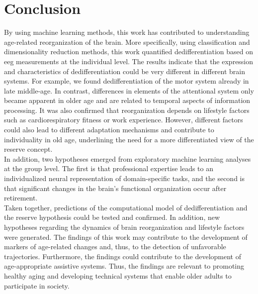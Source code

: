 \section{Conclusion}
By using machine learning methods, this work has contributed to understanding age-related reorganization of the brain. More specifically, using classification and dimensionality reduction methods, this work quantified dedifferentiation based on \gls{eeg} measurements at the individual level. The results indicate that the expression and characteristics of dedifferentiation could be very different in different brain systems. For example, we found dedifferentiation of the motor system already in late middle-age. In contrast, differences in elements of the attentional system only became apparent in older age and are related to temporal aspects of information processing. It was also confirmed that reorganization depends on lifestyle factors such as cardiorespiratory fitness or work experience. However, different factors could also lead to different adaptation mechanisms and contribute to individuality in old age, underlining the need for a more differentiated view of the reserve concept.\\
In addition, two hypotheses emerged from exploratory machine learning analyses at the group level. The first is that professional expertise leads to an individualized neural representation of domain-specific tasks, and the second is that significant changes in the brain's functional organization occur after retirement.\\
Taken together, predictions of the computational model of dedifferentiation and the reserve hypothesis could be tested and confirmed. In addition, new hypotheses regarding the dynamics of brain reorganization and lifestyle factors were generated. The findings of this work may contribute to the development of markers of age-related changes and, thus, to the detection of unfavorable trajectories. Furthermore, the findings could contribute to the development of age-appropriate assistive systems. Thus, the findings are relevant to promoting healthy aging and developing technical systems that enable older adults to participate in society.




